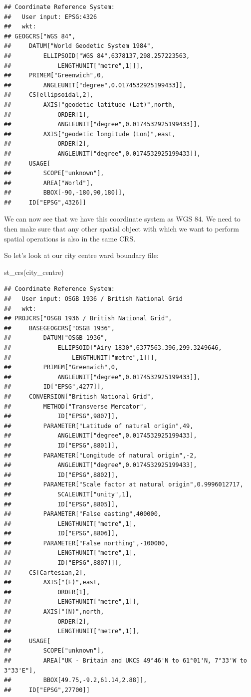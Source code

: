 \documentclass[
]{book}
\newenvironment{Shaded}{\begin{snugshade}}{\end{snugshade}}
\newcommand{\FunctionTok}[1]{\textcolor[rgb]{0.00,0.00,0.00}{#1}}
\newcommand{\NormalTok}[1]{#1}
\begin{document}
\begin{verbatim}
## Coordinate Reference System:
##   User input: EPSG:4326 
##   wkt:
## GEOGCRS["WGS 84",
##     DATUM["World Geodetic System 1984",
##         ELLIPSOID["WGS 84",6378137,298.257223563,
##             LENGTHUNIT["metre",1]]],
##     PRIMEM["Greenwich",0,
##         ANGLEUNIT["degree",0.0174532925199433]],
##     CS[ellipsoidal,2],
##         AXIS["geodetic latitude (Lat)",north,
##             ORDER[1],
##             ANGLEUNIT["degree",0.0174532925199433]],
##         AXIS["geodetic longitude (Lon)",east,
##             ORDER[2],
##             ANGLEUNIT["degree",0.0174532925199433]],
##     USAGE[
##         SCOPE["unknown"],
##         AREA["World"],
##         BBOX[-90,-180,90,180]],
##     ID["EPSG",4326]]
\end{verbatim}

We can now see that we have this coordinate system as WGS 84. We need to then make sure that any other spatial object with which we want to perform spatial operations is also in the same CRS.

So let's look at our city centre ward boundary file:

\begin{Shaded}
\begin{Highlighting}[]
\FunctionTok{st\_crs}\NormalTok{(city\_centre)}
\end{Highlighting}
\end{Shaded}

\begin{verbatim}
## Coordinate Reference System:
##   User input: OSGB 1936 / British National Grid 
##   wkt:
## PROJCRS["OSGB 1936 / British National Grid",
##     BASEGEOGCRS["OSGB 1936",
##         DATUM["OSGB 1936",
##             ELLIPSOID["Airy 1830",6377563.396,299.3249646,
##                 LENGTHUNIT["metre",1]]],
##         PRIMEM["Greenwich",0,
##             ANGLEUNIT["degree",0.0174532925199433]],
##         ID["EPSG",4277]],
##     CONVERSION["British National Grid",
##         METHOD["Transverse Mercator",
##             ID["EPSG",9807]],
##         PARAMETER["Latitude of natural origin",49,
##             ANGLEUNIT["degree",0.0174532925199433],
##             ID["EPSG",8801]],
##         PARAMETER["Longitude of natural origin",-2,
##             ANGLEUNIT["degree",0.0174532925199433],
##             ID["EPSG",8802]],
##         PARAMETER["Scale factor at natural origin",0.9996012717,
##             SCALEUNIT["unity",1],
##             ID["EPSG",8805]],
##         PARAMETER["False easting",400000,
##             LENGTHUNIT["metre",1],
##             ID["EPSG",8806]],
##         PARAMETER["False northing",-100000,
##             LENGTHUNIT["metre",1],
##             ID["EPSG",8807]]],
##     CS[Cartesian,2],
##         AXIS["(E)",east,
##             ORDER[1],
##             LENGTHUNIT["metre",1]],
##         AXIS["(N)",north,
##             ORDER[2],
##             LENGTHUNIT["metre",1]],
##     USAGE[
##         SCOPE["unknown"],
##         AREA["UK - Britain and UKCS 49°46'N to 61°01'N, 7°33'W to 3°33'E"],
##         BBOX[49.75,-9.2,61.14,2.88]],
##     ID["EPSG",27700]]
\end{verbatim}
\end{document}
